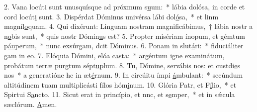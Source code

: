 2. Vana locúti sunt unusquísque ad próxmum s\uline{u}um:~* lábia dolósa, in corde et cord locút\uline{i} sunt.
3. Dispérdat Dóminus univérsa lábi dol\uline{ó}sa,~* et linm magníl\uline{o}quam.
4. Qui dixérunt: Linguam nostram magnificábimus,~† lábia nostr a n\uline{o}bis sunt,~* quis nostr Dómin\uline{u}s est?
5. Propter misériam ínopum, et gémtum p\uline{áu}perum,~* nunc exsúrgam, dcit Dóm\uline{i}nus.
6. Ponam in slut\uline{á}ri:~* fiduciáliter gam in \uline{e}o.
7. Elóquia Dómini, elóa c\uline{a}sta:~* argéntum igne examinátum, probátum terræ purgtum sépt\uline{u}plum.
8. Tu, Dómine, servábis nos: et custdi\uline{e}s nos~* a generatióne hc in æt\uline{é}rnum.
9. In circúitu ímpi \uline{á}mbulant:~* secúndum altitúdinem tuam multiplicásti fílos hóm\uline{i}num.
10. Glória Patr, et F\uline{í}lio,~* et Spirtui S\uline{a}ncto.
11. Sicut erat in princípio, et nnc, et s\uline{e}mper,~* et in sǽcula sæclórum. \uline{A}men.
